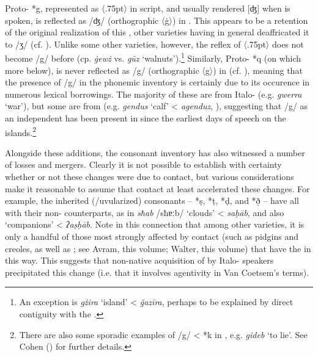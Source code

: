 \documentclass[output=paper]{langsci/langscibook}
\begin{document}
Proto- *g, represented as 〈\kern .75pt{}〉 in  script, and usually rendered [ʤ] when   is spoken, is reflected as /ʤ/ (orthographic 〈ġ〉) in . This appears to be a retention of the original  realization of this , other  varieties having in general deaffricated it to /ʒ/ (cf. \citealt[136]{Heath2002}). Unlike some other  varieties, however, the  reflex of 〈\kern .75pt{}〉 does not become /g/ before  (cp.  \textit{ġewż} vs.  \textit{gūz} `walnuts').\footnote{An exception is \textit{gżira} `island' <  \textit{ǧaz\={i}ra}, perhaps to be explained by direct contiguity with the .} Similarly, Proto- *q (on which more below), is never reflected as /g/ (orthographic 〈g〉) in  (cf. \citealt[99]{Vanhove1998}), meaning that the presence of /g/ in the  phonemic inventory is certainly due to its occurence in numerous lexical borrowings. The majority of these are from Italo- (e.g. \textit{gwerra} `war'), but some are from  (e.g. \textit{gendus} `calf' <  \textit{agenduz}, \citealt[827]{naitzerrad2002}), suggesting that /g/ as an independent  has been present in  since the earliest days of  speech on the  islands.\footnote{There are also some sporadic examples of /g/ < *k in  , e.g. \textit{gideb} `to lie'. See Cohen (\citeyear[14--15]{cohen1966}) for further details.}


 \label{mergers}
Alongside these additions, the  consonant  inventory has also witnessed a number of losses and mergers. Clearly it is not possible to establish with certainty whether or not these changes were due to contact, but various considerations make it reasonable to assume that contact at least accelerated these changes. For example, the inherited  (/uvularized) consonants -- *\d{s}, *\d{t}, *\d{d}, and *\d{ð} -- have all  with their non- counterparts, as in \textit{sħab} /sħɐːb/ `clouds' < \textit{sa\d{h}\={a}b}, and also `companions' < \textit{ʔa\d{s}\d{h}\={a}b}. Note in this connection that among other  varieties, it is only a handful of those most strongly affected by contact (such as pidgins and creoles, as well as  ; see Avram, this volume; Walter, this volume) that have  the  in this way. This suggests that non-native acquisition of  by Italo- speakers precipitated this change (i.e. that it involves  agentivity in Van Coetsem's \citeyear{VanCoetsem1988,VanCoetsem2000} terms).
\end{document}
